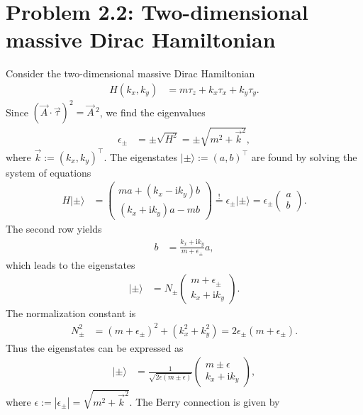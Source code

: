 \documentclass[english, parskip=full]{scrartcl}
\newcommand{\kla}{}
\newcommand{\Ket}{}
\renewcommand{\i}{\text{i}}
\begin{document}
\newpage
\section*{Problem 2.2: Two-dimensional massive Dirac Hamiltonian}
Consider the two-dimensional massive Dirac Hamiltonian
\begin{align}
H(k_x,k_y) &= m\tau_z + k_x\tau_x + k_y\tau_y.
\end{align}
Since $(\vec{A}\cdot\vec{\tau})^2 = \vec{A}\,^2$, we find the eigenvalues 
\begin{align}
\epsilon_\pm &= \pm\sqrt{H^2} = \pm\sqrt{m^2 + \vec{k}^2},
\end{align}
where $\vec{k} := (k_x, k_y)^\top$.
The eigenstates $\Ket | \pm \rangle := (a, b)^\top$ are found by solving the system of equations
\begin{align}
H\Ket | \pm \rangle &= \begin{pmatrix}
ma + (k_x-\i k_y)b \\ (k_x + \i k_y)a - mb
\end{pmatrix} \overset{!}{=} \epsilon_\pm\Ket | \pm \rangle = \epsilon_\pm \begin{pmatrix}
a \\ b
\end{pmatrix}.
\end{align}
The second row yields
\begin{align}
b &= \frac{k_x + \i k_y}{m + \epsilon_\pm} a,
\end{align}
which leads to the eigenstates 
\begin{align}
\Ket | \pm \rangle &= N_\pm \begin{pmatrix}
m + \epsilon_\pm \\ k_x + \i k_y
\end{pmatrix}.
\end{align}
The normalization constant is
\begin{align}
N_\pm^2 &= (m+\epsilon_\pm)^2 + (k_x^2 + k_y^2) = 2\epsilon_\pm\kla\left( m + \epsilon_\pm \right).
\end{align}
Thus the eigenstates can be expressed as
\begin{align}
\Ket | \pm \rangle &= \frac{1}{\sqrt{2\epsilon (m \pm \epsilon)}} \begin{pmatrix}
m \pm \epsilon \\ k_x + \i k_y
\end{pmatrix},
\end{align}
where $\epsilon := |\epsilon_\pm| = \sqrt{m^2 + \vec{k}^2}$.
The Berry connection is given by
\end{document}
